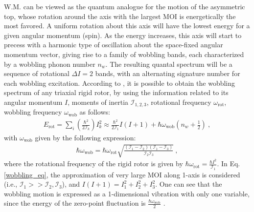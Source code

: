 \documentclass[11pt]{article}
\begin{document}
W.M. can be viewed as the quantum analogue for the motion of the asymmetric top, whose rotation around the axis with the largest MOI is energetically the most favored. A uniform rotation about this axis will have the lowest energy for a given angular momentum (spin). As the energy increases, this axis will start to precess with a harmonic type of oscillation about the space-fixed angular momentum vector, giving rise to a family of wobbling bands, each characterized by a wobbling phonon number $n_w$. The resulting quantal spectrum will be a sequence of rotational $\Delta I=2$ bands, with an alternating signature number for each wobbling excitation. According to \cite{bohr1998nuclear}, it is possible to obtain the wobbling spectrum of any triaxial rigid rotor, by using the information related to its angular momentum $I$, moments of inertia $\mathcal{I}_{1,2,3}$, rotational frequency $\omega_\text{rot}$, wobbling frequency $\omega_\text{wob}$ as follows:
\begin{align}
    E_\text{rot}=\sum_i\left(\frac{\hbar^2}{2\mathcal{I}_k}\right)I^2_k\approx\frac{\hbar^2}{2\mathcal{I}_1}I(I+1)+\hbar\omega_\text{wob}\left(n_w+\frac{1}{2}\right)\ , \label{wobbling_eq}
\end{align}
with $\omega_\text{wob}$ given by the following expression:
\begin{align}
    \hbar\omega_\text{wob}=\hbar\omega_\text{rot}\sqrt{\frac{(\mathcal{I}_1-\mathcal{I}_2)(\mathcal{I}_1-\mathcal{I}_3)}{\mathcal{I}_2\mathcal{I}_3}}\ ,
\end{align}
where the rotational frequency of the rigid rotor is given by $\hbar\omega_\text{rot}=\frac{\hbar I^2}{\mathcal{I}_1}$. In Eq. \ref{wobbling_eq}, the approximation of very large MOI along 1-axis is considered (i.e., $\mathcal{I}_1>>\mathcal{I}_2,\mathcal{I}_3$), and $I(I+1)=I_1^2+I_2^2+I_3^2$. One can see that the wobbling motion is expressed as a 1-dimensional vibration with only one variable, since the energy of the zero-point fluctuation is $\frac{\hbar\omega_\text{wob}}{2}$ \cite{hagemann2003quantized}.
\end{document}
